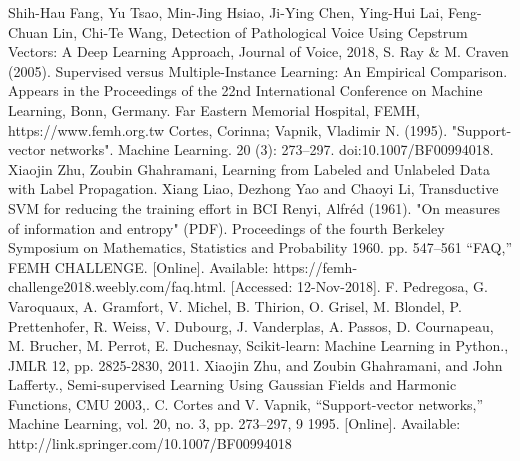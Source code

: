 \documentclass[conference]{IEEEtran}
\begin{document}
\begin{thebibliography}{00}
Shih-Hau Fang, Yu Tsao, Min-Jing Hsiao, Ji-Ying Chen, Ying-Hui Lai, Feng-Chuan Lin, Chi-Te Wang,
Detection of Pathological Voice Using Cepstrum Vectors: A Deep Learning Approach,
Journal of Voice, 2018,
S. Ray \& M. Craven (2005).
Supervised versus Multiple-Instance Learning: An Empirical Comparison.
Appears in the Proceedings of the 22nd International Conference on Machine Learning, Bonn, Germany.
Far Eastern Memorial Hospital, FEMH, https://www.femh.org.tw
Cortes, Corinna; Vapnik, Vladimir N. (1995). "Support-vector networks". Machine Learning. 20 (3): 273–297. doi:10.1007/BF00994018.
Xiaojin Zhu, Zoubin Ghahramani, Learning from Labeled and Unlabeled Data with Label Propagation. 
Xiang Liao, Dezhong Yao and Chaoyi Li, Transductive SVM for reducing the training effort in BCI
Renyi, Alfréd (1961). "On measures of information and entropy" (PDF). Proceedings of the fourth Berkeley Symposium on Mathematics, Statistics and Probability 1960. pp. 547–561
“FAQ,” FEMH CHALLENGE. [Online]. Available: https://femh-challenge2018.weebly.com/faq.html. [Accessed: 12-Nov-2018].
F. Pedregosa, G. Varoquaux, A. Gramfort, V. Michel, B. Thirion, O. Grisel, M. Blondel, P. Prettenhofer, R. Weiss, V. Dubourg, J. Vanderplas, A. Passos, D. Cournapeau, M. Brucher, M. Perrot, E. Duchesnay, Scikit-learn: Machine Learning in Python., JMLR 12, pp. 2825-2830, 2011.
Xiaojin Zhu, and Zoubin Ghahramani, and John Lafferty., Semi-supervised Learning Using Gaussian Fields and Harmonic Functions, CMU 2003,.
 C. Cortes and V. Vapnik, “Support-vector networks,” Machine
Learning, vol. 20, no. 3, pp. 273–297, 9 1995. [Online]. Available: http://link.springer.com/10.1007/BF00994018
\end{thebibliography}
\end{document}
